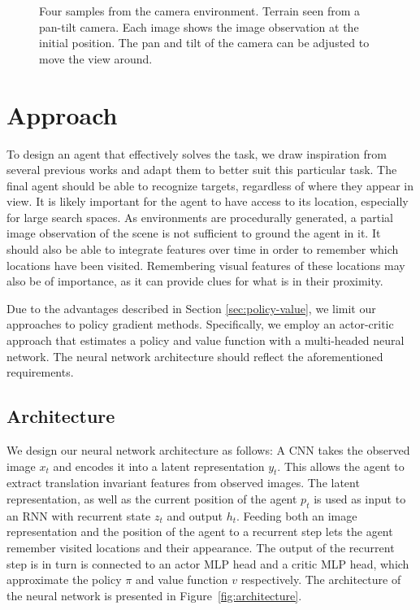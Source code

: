 \begin{figure}
    \centering
    
    \caption[Camera environment]{Four samples from the camera environment. Terrain seen from a pan-tilt camera. Each image shows the image observation at the initial position. The pan and tilt of the camera can be adjusted to move the view around.}
    \label{fig:camera}
\end{figure}

\section{Approach}
\label{sec:approach}

To design an agent that effectively solves the task, we draw inspiration from several previous works and adapt them to better suit this particular task.
The final agent should be able to recognize targets, regardless of where they appear in view.
It is likely important for the agent to have access to its location, especially for large search spaces.
As environments are procedurally generated, a partial image observation of the scene is not sufficient to ground the agent in it.
It should also be able to integrate features over time in order to remember which locations have been visited.
Remembering visual features of these locations may also be of importance, as it can provide clues for what is in their proximity.

Due to the advantages described in Section \ref{sec:policy-value}, we limit our approaches to policy gradient methods.
Specifically, we employ an actor-critic approach that estimates a policy and value function with a multi-headed neural network.
The neural network architecture should reflect the aforementioned requirements.

\subsection{Architecture}

We design our neural network architecture as follows:
A CNN takes the observed image \(x_t\) and encodes it into a latent representation \(y_t\).
This allows the agent to extract translation invariant features from observed images.
The latent representation, as well as the current position of the agent \(p_t\) is used as input to an RNN with recurrent state \(z_t\) and output \(h_t\).
Feeding both an image representation and the position of the agent to a recurrent step lets the agent remember visited locations and their appearance.
The output of the recurrent step is in turn is connected to an actor MLP head and a critic MLP head, which approximate the policy \(\pi\) and value function \(v\) respectively.
The architecture of the neural network is presented in Figure~\ref{fig:architecture}.

